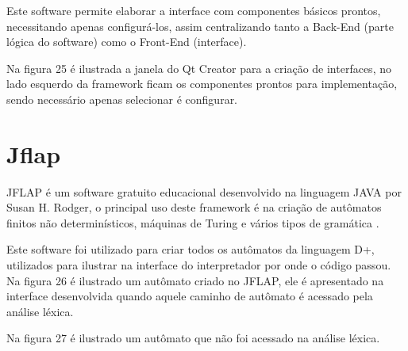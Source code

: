 \documentclass[12pt,oneside,a4paper,chapter=TITLE,section=TITLE,sumario=tradicional]{abntex2}
\begin{document}
\begin{figure}[htb]
\end{figure} 

Este software permite elaborar a interface com componentes básicos prontos, necessitando apenas configurá-los, assim centralizando tanto a Back-End (parte lógica do software) como o Front-End (interface). 

Na figura 25 é ilustrada a janela do Qt Creator para a criação de interfaces, no lado esquerdo da framework ficam os componentes prontos para implementação, sendo necessário apenas selecionar é configurar.

\begin{figure}[htb]
\end{figure} 

\section{Jflap}
\label{sec:jflap}

JFLAP é um software gratuito educacional desenvolvido na linguagem JAVA por Susan H. Rodger, o principal uso deste framework é na criação de autômatos finitos não determinísticos, máquinas de Turing e vários tipos de gramática \cite{susan2005}.

Este software foi utilizado para criar todos os autômatos da linguagem D+, utilizados para ilustrar na interface do interpretador por onde o código passou. Na figura 26 é ilustrado um autômato criado no JFLAP, ele é apresentado na interface desenvolvida quando aquele caminho de autômato é acessado pela análise léxica.

\begin{figure}[htb]
\end{figure} 

Na figura 27 é ilustrado um autômato que não foi acessado na análise léxica.

\begin{figure}[H]
\end{figure} 
\end{document}
